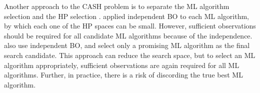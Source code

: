 Another approach to the CASH problem is to separate the ML algorithm selection and the HP selection \cite{nguyen2020bayesian,liu2020admm,li2020efficient,li2023volcanoml}.
%
\cite{nguyen2020bayesian} applied independent BO to each ML algorithm, by which each one of the HP spaces can be small.
%
However, sufficient observations should be required for all candidate ML algorithms because of the independence. 
\cite{li2020efficient,li2023volcanoml} also use independent BO, and select only a promising ML algorithm as the final search candidate. 
%
This approach can reduce the search space, but to select an ML algorithm appropriately, sufficient observations are again required for all ML algorithms.
%
Further, in practice, there is a risk of discording the true best ML algorithm.




